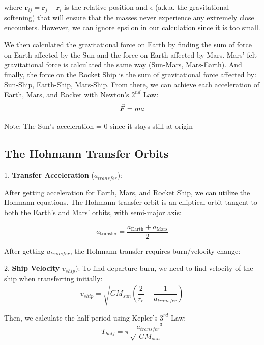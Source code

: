 \documentclass[12pt,a4paper,twocolumn,twoside]{tau-class/tau}
\begin{document}
where $\mathbf{r}_{ij} = \mathbf{r}_j - \mathbf{r}_i$ is the relative position and $\epsilon$  (a.k.a. the gravitational softening) that will ensure that the masses never experience any extremely close encounters. However, we can ignore epsilon in our calculation since it is too small.

We then calculated the gravitational force on Earth by finding the sum of force on Earth affected by the Sun and the force on Earth affected by Mars. Mars' felt gravitational force is calculated the same way (Sun-Mars, Mars-Earth). And finally, the force on the Rocket Ship is the sum of gravitational force affected by: Sun-Ship, Earth-Ship, Mars-Ship.
From there, we can achieve each acceleration of Earth, Mars, and Rocket with Newton's $2^{nd}$ Law:
\begin{equation}
    \vec{F} = ma
    \label{Newton's $2^{nd}$ Law}
\end{equation}

Note: The Sun's acceleration = 0 since it stays still at origin

\subsection{The Hohmann Transfer Orbits}

1. \textbf{Transfer Acceleration} ($a_{transfer}$):

 After getting acceleration for Earth, Mars, and Rocket Ship, we can utilize the Hohmann equations. The Hohmann transfer orbit is an elliptical orbit tangent to both the Earth's and Mars' orbits, with semi-major axis:

 \begin{equation}
    a_{\text{transfer}} = \frac{a_{\text{Earth}} + a_{\text{Mars}}}{2}
\end{equation}

After getting $a_{transfer}$, the Hohmann transfer requires burn/velocity change: 

2. \textbf{Ship Velocity} $v_{ship}$):
To find departure burn, we need to find velocity of the ship when transferring initially:
\begin{equation}
    v_{ship} = \sqrt{GM_{sun}\left(\frac{2}{r_e} - \frac{1}{a_{transfer}}\right)} 
    \label{Equation of Departure Burn/Velocity}
\end{equation}

Then, we calculate the half-period using Kepler's $3^{rd}$ Law:
\begin{equation}
    T_{half} = \pi\sqrt\frac{{{a_{transfer}}^3}}{GM_{sun}}
\end{equation}
\end{document}
